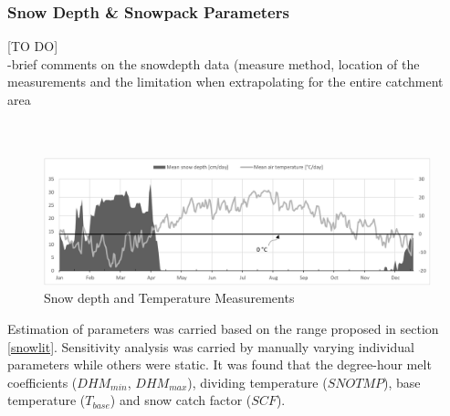 
\subsubsection{Snow Depth \& Snowpack Parameters}

[TO DO] \\

-brief comments on the snowdepth data (measure method, location of the measurements and the limitation when extrapolating for the entire catchment area \\ \\ \\

\begin{figure}[h]
    \centering
	\includegraphics[scale=0.45]{figures/measuredsnowpack.png}
	\caption{Snow depth and Temperature Measurements \citet{fmidata}}
	\label{fig:snowmeasurement}
\end{figure}
        
Estimation of parameters was carried based on the range proposed in section \ref{snowlit}. Sensitivity analysis was carried by manually varying individual parameters while others were static. It was found that the degree-hour melt coefficients ($DHM_{min}$, $DHM_{max}$), dividing temperature ($SNOTMP$), base temperature ($T_{base}$) and snow catch factor ($SCF$).

